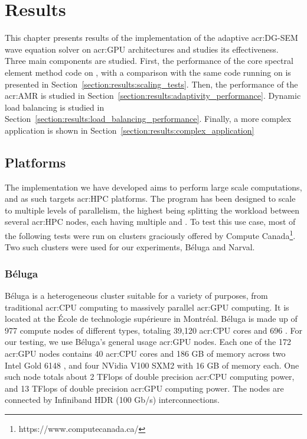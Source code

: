 \chapter{Results}\label{chapter:results}

This chapter presents results of the implementation of the adaptive \acrshort{acr:DG-SEM} wave
equation solver on \acrshort{acr:GPU} architectures and studies its effectiveness. Three main
components are studied. First, the performance of the core spectral element method code on
, with a comparison with the same code running on  is
presented in Section~\ref{section:results:scaling_tests}. Then, the performance of the
\acrlong{acr:AMR} is studied in Section~\ref{section:results:adaptivity_performance}. Dynamic load
balancing is studied in Section~\ref{section:results:load_balancing_performance}. Finally, a more
complex application is shown in Section~\ref{section:results:complex_application}

\section{Platforms}\label{section:results:platforms}

The implementation we have developed aims to perform large scale computations, and as such targets
\acrshort{acr:HPC} platforms. The program has been designed to scale to multiple levels of
parallelism, the highest being splitting the workload between several \acrshort{acr:HPC} nodes, each
having multiple  and . To test this use case, most of the
following tests were run on clusters graciously offered by Compute
Canada\footnote{https://www.computecanada.ca/}. Two such clusters were used for our experiments,
Béluga and Narval.

\subsection{Béluga}\label{subsection:results:platforms:beluga}

Béluga is a heterogeneous cluster suitable for a variety of purposes, from traditional
\acrshort{acr:CPU} computing to massively parallel \acrshort{acr:GPU} computing. It is located at
the École de technologie supérieure in Montréal. Béluga is made up of 977 compute nodes of different
types, totaling 39,120 \acrshort{acr:CPU} cores and 696 . For our testing, we
use Béluga's general usage \acrshort{acr:GPU} nodes. Each one of the 172 \acrshort{acr:GPU} nodes
contains 40 \acrshort{acr:CPU} cores and 186 GB of memory across two Intel Gold 6148
, and four NVidia V100 SXM2  with 16 GB of memory each. One
such node totals about 2 TFlops of double precision \acrshort{acr:CPU} computing power, and 13
TFlops of double precision \acrshort{acr:GPU} computing power. The nodes are connected by Infiniband
HDR (100 Gb/s) interconnections.

